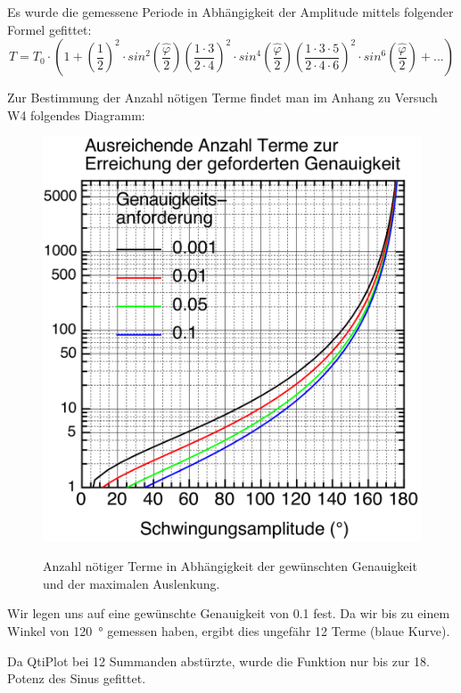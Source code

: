 Es wurde die gemessene Periode in Abh\"angigkeit der Amplitude mittels folgender
Formel gefittet:
\begin{equation}
    T = T_0 \cdot
        \left(
            1 +
            \left( \frac{1}{2} \right)^2 \cdot sin^2 \left( \frac{\hat{\varphi}}{2} \right)
            \left( \frac{1 \cdot 3}{2 \cdot 4} \right)^2 \cdot sin^4 \left( \frac{\hat{\varphi}}{2} \right)
            \left( \frac{1 \cdot 3 \cdot 5}{2 \cdot 4 \cdot 6} \right)^2 \cdot sin^6 \left( \frac{\hat{\varphi}}{2} \right)
            + ...
        \right)
\end{equation}

Zur Bestimmung der Anzahl n\"otigen Terme findet man im Anhang zu Versuch W4 folgendes
Diagramm:
\begin{figure}[h!]
    \centering
    \includegraphics[width=.67\textwidth]{images/w4terme.png}
    \label{fig:w4terme}
    \caption{%
        Anzahl n\"otiger Terme in Abh\"angigkeit der gew\"unschten Genauigkeit
        und der maximalen Auslenkung.
    }
\end{figure}

Wir legen uns auf eine gew\"unschte Genauigkeit von \num{0.1} fest. Da wir bis
zu einem Winkel  von \SI{120}{\degree} gemessen haben,  ergibt dies ungef\"ahr
12 Terme (blaue Kurve).

Da  QtiPlot bei  12  Summanden abst\"urzte,  wurde die  Funktion  nur bis  zur
18. Potenz des Sinus gefittet.

